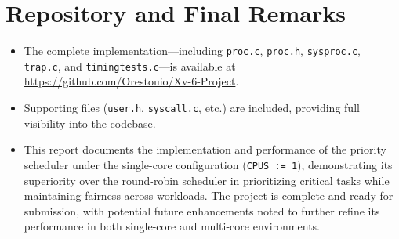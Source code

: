 \documentclass{article}
\begin{document}
\section{Repository and Final Remarks}
\begin{itemize}
    \item The complete implementation—including \texttt{proc.c}, \texttt{proc.h}, \texttt{sysproc.c}, \texttt{trap.c}, and \texttt{timingtests.c}—is available at \url{https://github.com/Orestouio/Xv-6-Project}.
    \item Supporting files (\texttt{user.h}, \texttt{syscall.c}, etc.) are included, providing full visibility into the codebase.
    \item This report documents the implementation and performance of the priority scheduler under the single-core configuration (\texttt{CPUS := 1}), demonstrating its superiority over the round-robin scheduler in prioritizing critical tasks while maintaining fairness across workloads. The project is complete and ready for submission, with potential future enhancements noted to further refine its performance in both single-core and multi-core environments.
\end{itemize}
\end{document}
